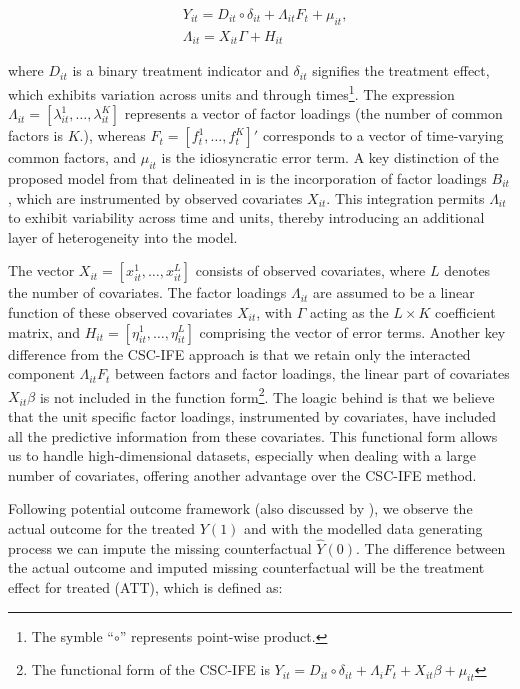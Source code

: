 \documentclass[12pt]{article}
\begin{document}
\begin{equation}
\begin{aligned}
& Y_{it} = D_{it} \circ \delta_{it} + \Lambda_{it}F_{t} + \mu_{it}, \\
& \Lambda_{it} = X_{it}\Gamma + H_{it}
\end{aligned}
\label{eqn: functional form}
\end{equation}

\noindent where $D_{it}$ is a binary treatment indicator and $\delta_{it}$ signifies the treatment effect, which exhibits variation across units and through times\footnote{The symble ``$\circ$'' represents point-wise product.}. The expression $\Lambda_{it} = [\lambda_{it}^1, \ldots, \lambda_{it}^K]$ represents a vector of factor loadings (the number of common factors is $K$.), whereas $F_{t} = [f_{t}^1, \ldots, f_{t}^K]'$ corresponds to a vector of time-varying common factors, and $\mu_{it}$ is the idiosyncratic error term. A key distinction of the proposed model from that delineated in \cite{xu2017generalized} is the incorporation of factor loadings $B_{it}$, which are instrumented by observed covariates $X_{it}$. This integration permits $\Lambda_{it}$ to exhibit variability across time and units, thereby introducing an additional layer of heterogeneity into the model.

The vector $X_{it} = [x_{it}^1, \ldots, x_{it}^L]$ consists of observed covariates, where $L$ denotes the number of covariates. The factor loadings $\Lambda_{it}$ are assumed to be a linear function of these observed covariates $X_{it}$, with $\Gamma$ acting as the $L\times K$ coefficient matrix, and $H_{it} = [\eta_{it}^1, \ldots, \eta_{it}^L]$ comprising the vector of error terms. Another key difference from the CSC-IFE approach is that we retain only the interacted component $\Lambda_{it} F_t$ between factors and factor loadings, the linear part of covariates $X_{it}\beta$ is not included in the function form\footnote{The functional form of the CSC-IFE is $Y_{it} = D_{it} \circ \delta_{it} + \Lambda_{i}F_{t} + X_{it}\beta + \mu_{it}$}. The loagic behind is that we believe that the unit specific factor loadings, instrumented by covariates, have included all the predictive information from these covariates. This functional form allows us to handle high-dimensional datasets, especially when dealing with a large number of covariates, offering another advantage over the CSC-IFE method.

Following \cite{splawa1990application} potential outcome framework (also discussed by \cite{rubin1974estimating, rubin2005causal}), we observe the actual outcome for the treated $Y(1)$ and with the modelled data generating process we can impute the missing counterfactual $\hat{Y}(0)$. The difference between the actual outcome and imputed missing counterfactual will be the treatment effect for treated (ATT), which is defined as:
\end{document}
